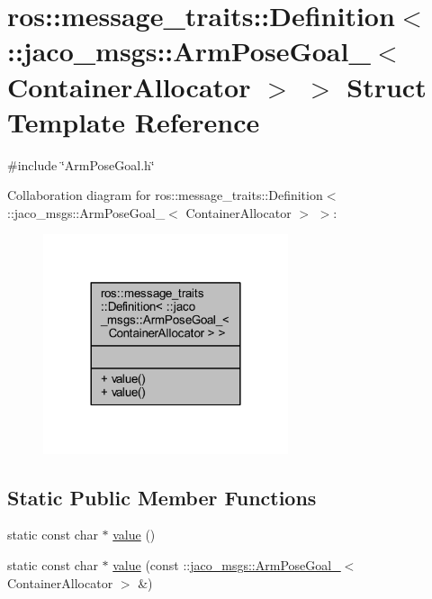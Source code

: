 \hypertarget{structros_1_1message__traits_1_1Definition_3_01_1_1jaco__msgs_1_1ArmPoseGoal___3_01ContainerAllocator_01_4_01_4}{}\section{ros\+:\+:message\+\_\+traits\+:\+:Definition$<$ \+:\+:jaco\+\_\+msgs\+:\+:Arm\+Pose\+Goal\+\_\+$<$ Container\+Allocator $>$ $>$ Struct Template Reference}
\label{structros_1_1message__traits_1_1Definition_3_01_1_1jaco__msgs_1_1ArmPoseGoal___3_01ContainerAllocator_01_4_01_4}


{\ttfamily \#include \char`\"{}Arm\+Pose\+Goal.\+h\char`\"{}}



Collaboration diagram for ros\+:\+:message\+\_\+traits\+:\+:Definition$<$ \+:\+:jaco\+\_\+msgs\+:\+:Arm\+Pose\+Goal\+\_\+$<$ Container\+Allocator $>$ $>$\+:
\nopagebreak
\begin{figure}[H]
\begin{center}
\leavevmode
\includegraphics[width=204pt]{d3/d87/structros_1_1message__traits_1_1Definition_3_01_1_1jaco__msgs_1_1ArmPoseGoal___3_01ContainerAllocator_01_4_01_4__coll__graph}
\end{center}
\end{figure}
\subsection*{Static Public Member Functions}
\begin{DoxyCompactItemize}
\item 
static const char $\ast$ \hyperlink{structros_1_1message__traits_1_1Definition_3_01_1_1jaco__msgs_1_1ArmPoseGoal___3_01ContainerAllocator_01_4_01_4_a9cc4abe68800edc0f0e01eb1e9ae3c06}{value} ()
\item 
static const char $\ast$ \hyperlink{structros_1_1message__traits_1_1Definition_3_01_1_1jaco__msgs_1_1ArmPoseGoal___3_01ContainerAllocator_01_4_01_4_a5173865d500249d83986da0c10f4b9d6}{value} (const \+::\hyperlink{structjaco__msgs_1_1ArmPoseGoal__}{jaco\+\_\+msgs\+::\+Arm\+Pose\+Goal\+\_\+}$<$ Container\+Allocator $>$ \&)
\end{DoxyCompactItemize}


